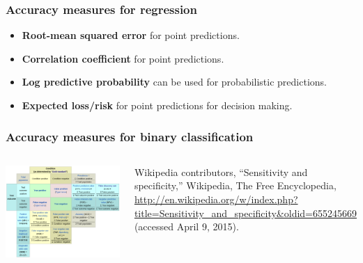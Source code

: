 
\begin{frame}
\frametitle{Accuracy measures for regression}
\begin{itemize}
\item {\bf Root-mean squared error} for point predictions.
\item {\bf Correlation coefficient} for point predictions.
\item {\bf Log predictive probability} can be used for probabilistic predictions.
\item {\bf Expected loss/risk} for point predictions for decision making.
\end{itemize}
\end{frame}

\begin{frame}
\frametitle{Accuracy measures for binary classification}
\begin{columns}
\includegraphics[width=\textwidth]{contingency_table_wikipedia}
\begin{tiny}
Wikipedia contributors, ``Sensitivity and specificity,'' Wikipedia, The Free Encyclopedia, \url{http://en.wikipedia.org/w/index.php?title=Sensitivity\_and\_specificity\&oldid=655245669} (accessed April 9, 2015).\par
\end{tiny}
\end{columns}
\end{frame}

